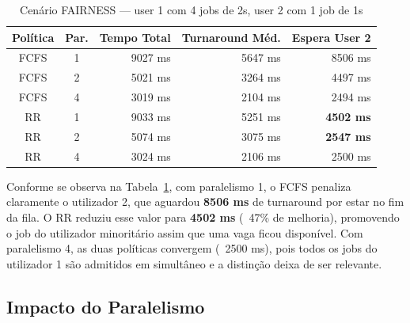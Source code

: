 \documentclass[runningheads,11pt]{llncs}
\begin{document}
                \begin{table}[H]
                \centering
                \begin{tabular}{|c|c|r|r|r|}
                \hline
                \textbf{Política} & \textbf{Par.} & \textbf{Tempo Total} & \textbf{Turnaround Méd.} & \textbf{Espera User 2} \\
                \hline
                FCFS & 1 & 9027 ms & 5647 ms & 8506 ms \\
                FCFS & 2 & 5021 ms & 3264 ms & 4497 ms \\
                FCFS & 4 & 3019 ms & 2104 ms & 2494 ms \\
                \hline
                RR   & 1 & 9033 ms & 5251 ms & \textbf{4502 ms} \\
                RR   & 2 & 5074 ms & 3075 ms & \textbf{2547 ms} \\
                RR   & 4 & 3024 ms & 2106 ms & 2500 ms \\
                \hline
                \end{tabular}
                \vspace{1em}
                \caption{Cenário FAIRNESS — user 1 com 4 jobs de 2s, user 2 com 1 job de 1s}
                \label{tab:fairness}
                \end{table}
                \vspace{-1em}

                Conforme se observa na Tabela~\ref{tab:fairness}, com paralelismo 1, o FCFS penaliza claramente o
                utilizador 2, que aguardou \textbf{8506 ms} de turnaround por estar no fim da fila. O RR reduziu
                esse valor para \textbf{4502 ms} (~47\% de melhoria), promovendo o job do utilizador minoritário
                assim que uma vaga ficou disponível. Com paralelismo 4, as duas políticas convergem (~2500 ms),
                pois todos os jobs do utilizador 1 são admitidos em simultâneo e a distinção deixa de ser relevante.

                \subsection{Impacto do Paralelismo}
\end{document}
